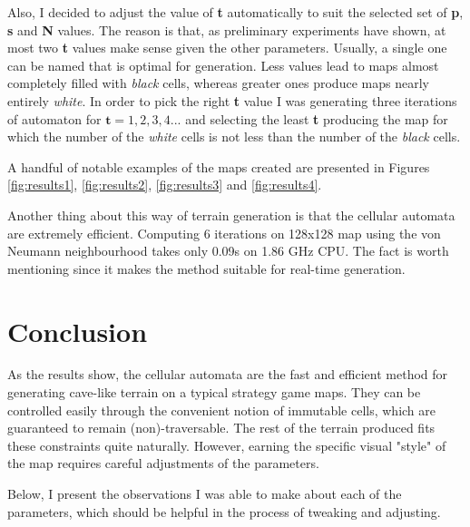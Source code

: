 \documentclass[a4paper, 11pt]{article} %
\begin{document}
Also, I decided to adjust the value of \textbf{t} automatically to suit the selected set of \textbf{p}, \textbf{s} and \textbf{N} values. The reason is that, as preliminary experiments have shown, at most two \textbf{t} values make sense given the other parameters. Usually, a single one can be named that is optimal for generation. Less values lead to maps almost completely filled with \emph{black} cells, whereas greater ones produce maps nearly entirely \emph{white}. In order to pick the right \textbf{t} value I was generating three iterations of automaton for $\textbf{t} = 1,2,3,4...$ and selecting the least \textbf{t} producing the map for which the number of the \emph{white} cells is not less than the number of the \emph{black} cells.

A handful of notable examples of the maps created are presented in Figures \ref{fig:results1}, \ref{fig:results2}, \ref{fig:results3} and \ref{fig:results4}.

Another thing about this way of terrain generation is that the cellular automata are extremely efficient. Computing 6 iterations on 128x128 map using the von Neumann neighbourhood takes only 0.09s on 1.86 GHz CPU. The fact is worth mentioning since it makes the method suitable for real-time generation. 


\section*{Conclusion}

As the results show, the cellular automata are the fast and efficient method for generating cave-like terrain on a typical strategy game maps. They can be controlled easily through the convenient notion of immutable cells, which are guaranteed to remain (non)-traversable. The rest of the terrain produced fits these constraints quite naturally. However, earning the specific visual "style" of the map requires careful adjustments of the parameters.

Below, I present the observations I was able to make about each of the parameters, which should be helpful in the process of tweaking and adjusting.
\end{document}
